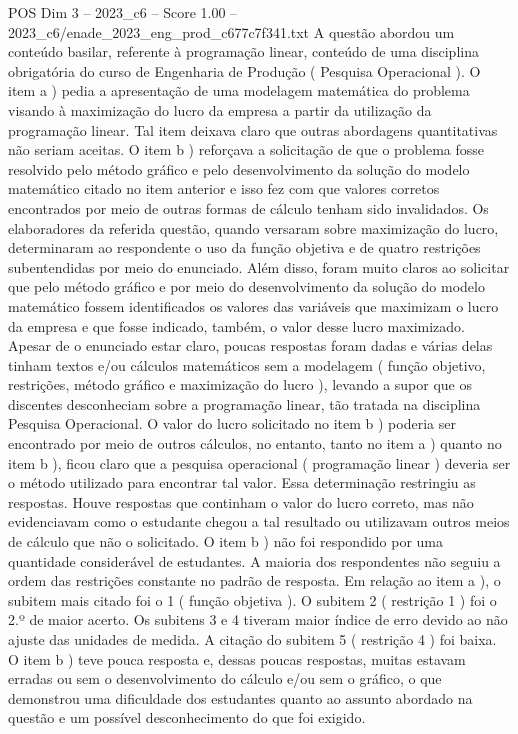 \begin{textsample}{POS Dim 3 – 2023\_c6 – Score 1.00 – 2023\_c6/enade\_2023\_eng\_prod\_c677c7f341.txt}
A questão abordou um conteúdo basilar, referente à programação linear, conteúdo de uma disciplina obrigatória do curso de Engenharia de Produção ( Pesquisa Operacional ).
O item a ) pedia a apresentação de uma modelagem matemática do problema visando à maximização do lucro da empresa a partir da utilização da programação linear.
Tal item deixava claro que outras abordagens quantitativas não seriam aceitas.
O item b ) reforçava a solicitação de que o problema fosse resolvido pelo método gráfico e pelo desenvolvimento da solução do modelo matemático citado no item anterior e isso fez com que valores corretos encontrados por meio de outras formas de cálculo tenham sido invalidados.
Os elaboradores da referida questão, quando versaram sobre maximização do lucro, determinaram ao respondente o uso da função objetiva e de quatro restrições subentendidas por meio do enunciado.
Além disso, foram muito claros ao solicitar que pelo método gráfico e por meio do desenvolvimento da solução do modelo matemático fossem identificados os valores das variáveis que maximizam o lucro da empresa e que fosse indicado, também, o valor desse lucro maximizado.
Apesar de o enunciado estar claro, poucas respostas foram dadas e várias delas tinham textos e/ou cálculos matemáticos sem a modelagem ( função objetivo, restrições, método gráfico e maximização do lucro ), levando a supor que os discentes desconheciam sobre a programação linear, tão tratada na disciplina Pesquisa Operacional.
O valor do lucro solicitado no item b ) poderia ser encontrado por meio de outros cálculos, no entanto, tanto no item a ) quanto no item b ), ficou claro que a pesquisa operacional ( programação linear ) deveria ser o método utilizado para encontrar tal valor.
Essa determinação restringiu as respostas.
Houve respostas que continham o valor do lucro correto, mas não evidenciavam como o estudante chegou a tal resultado ou utilizavam outros meios de cálculo que não o solicitado.
O item b ) não foi respondido por uma quantidade considerável de estudantes.
A maioria dos respondentes não seguiu a ordem das restrições constante no padrão de resposta.
Em relação ao item a ), o subitem mais citado foi o 1 ( função objetiva ).
O subitem 2 ( restrição 1 ) foi o 2.º de maior acerto.
Os subitens 3 e 4 tiveram maior índice de erro devido ao não ajuste das unidades de medida.
A citação do subitem 5 ( restrição 4 ) foi baixa.
O item b ) teve pouca resposta e, dessas poucas respostas, muitas estavam erradas ou sem o desenvolvimento do cálculo e/ou sem o gráfico, o que demonstrou uma dificuldade dos estudantes quanto ao assunto abordado na questão e um possível desconhecimento do que foi exigido.

\end{textsample}
